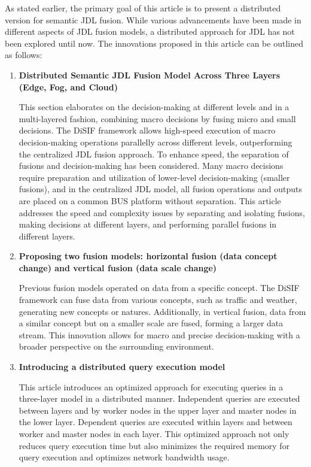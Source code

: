 \documentclass[5p,times]{elsarticle}
\begin{document}
As stated earlier, the primary goal of this article is to present a distributed version for semantic JDL fusion. While various advancements have been made in different aspects of JDL fusion models, a distributed approach for JDL has not been explored until now. The innovations proposed in this article can be outlined as follows:


\begin{enumerate}
\item \textbf{Distributed Semantic JDL Fusion Model Across Three Layers (Edge, Fog, and Cloud)} 

This section elaborates on the decision-making at different levels and in a multi-layered fashion, combining macro decisions by fusing micro and small decisions. The DiSIF framework allows high-speed execution of macro decision-making operations parallelly across different levels, outperforming the centralized JDL fusion approach. To enhance speed, the separation of fusions and decision-making has been considered. Many macro decisions require preparation and utilization of lower-level decision-making (smaller fusions), and in the centralized JDL model, all fusion operations and outputs are placed on a common BUS platform without separation. This article addresses the speed and complexity issues by separating and isolating fusions, making decisions at different layers, and performing parallel fusions in different layers.


\item \textbf{Proposing two fusion models: horizontal fusion (data concept change) and vertical fusion (data scale change)} 

Previous fusion models operated on data from a specific concept. The DiSIF framework can fuse data from various concepts, such as traffic and weather, generating new concepts or natures. Additionally, in vertical fusion, data from a similar concept but on a smaller scale are fused, forming a larger data stream. This innovation allows for macro and precise decision-making with a broader perspective on the surrounding environment.


\item \textbf{Introducing a distributed query execution model}

This article introduces an optimized approach for executing queries in a three-layer model in a distributed manner. Independent queries are executed between layers and by worker nodes in the upper layer and master nodes in the lower layer. Dependent queries are executed within layers and between worker and master nodes in each layer. This optimized approach not only reduces query execution time but also minimizes the required memory for query execution and optimizes network bandwidth usage.
\end{enumerate}
\end{document}

